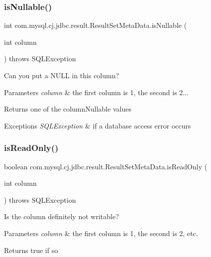 \subsubsection{\texorpdfstring{is\+Nullable()}{isNullable()}}
{\footnotesize\ttfamily int com.\+mysql.\+cj.\+jdbc.\+result.\+Result\+Set\+Meta\+Data.\+is\+Nullable (\begin{DoxyParamCaption}\item[{int}]{column }\end{DoxyParamCaption}) throws S\+Q\+L\+Exception}

Can you put a N\+U\+LL in this column?


\begin{DoxyParams}{Parameters}
{\em column} & the first column is 1, the second is 2...\\
\hline
\end{DoxyParams}
\begin{DoxyReturn}{Returns}
one of the column\+Nullable values
\end{DoxyReturn}

\begin{DoxyExceptions}{Exceptions}
{\em S\+Q\+L\+Exception} & if a database access error occurs \\
\hline
\end{DoxyExceptions}
\mbox{\label{classcom_1_1mysql_1_1cj_1_1jdbc_1_1result_1_1_result_set_meta_data_abecd50fda9e5c9639b59ac1d0c6d0591}} 
\subsubsection{\texorpdfstring{is\+Read\+Only()}{isReadOnly()}}
{\footnotesize\ttfamily boolean com.\+mysql.\+cj.\+jdbc.\+result.\+Result\+Set\+Meta\+Data.\+is\+Read\+Only (\begin{DoxyParamCaption}\item[{int}]{column }\end{DoxyParamCaption}) throws S\+Q\+L\+Exception}

Is the column definitely not writable?


\begin{DoxyParams}{Parameters}
{\em column} & the first column is 1, the second is 2, etc.\\
\hline
\end{DoxyParams}
\begin{DoxyReturn}{Returns}
true if so
\end{DoxyReturn}

